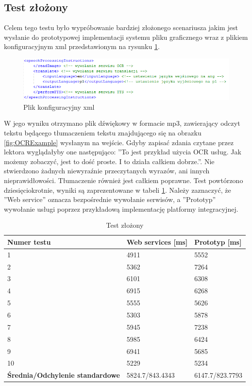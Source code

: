 \subsection{Test złożony}
Celem tego testu było wypróbowanie bardziej złożonego scenariusza jakim jest wysłanie do prototypowej implementacji systemu pliku graficznego wraz z plikiem konfiguracyjnym xml przedstawionym na rysunku \ref{fig:xmlConf}.
\begin{figure}[!h]
\centering
\includegraphics[scale=0.9]{xmlConf.png}
\caption{Plik konfiguracyjny xml}\label{fig:xmlConf}
\end{figure}
W jego wyniku otrzymano plik dźwiękowy w formacie mp3, zawierający odczyt tekstu będącego tłumaczeniem tekstu znajdującego się na obrazku \ref{fig:OCRExample} wysłanym na wejście. Gdyby zapisać zdania czytane przez lektora wyglądałyby one następująco: ''To jest przykład użycia OCR usług. Jak możemy zobaczyć, jest to dość proste. I to działa całkiem dobrze.''. Nie stwierdzono żadnych niewyraźnie przeczytanych wyrazów, ani innych nieprawidłowości. Tłumaczenie również jest całkiem poprawne. Test powtórzono dziesięciokrotnie, wyniki są zaprezentowane w tabeli \ref{tab:bigTest}. Należy zaznaczyć, że ''Web service'' oznacza bezpośrednie wywołanie serwisów, a ''Prototyp'' wywołanie usługi poprzez przykładową implementację platformy integracyjnej.
\begin{center}
	\begin{table}[t]
	\label{tab:bigTest}
	\caption{Test złożony}
	\centering
	\begin{tabular}{| l | l | l |}	
		\hline
		\textbf{Numer testu} & \textbf{Web services [ms]} & \textbf{Prototyp [ms]} \\ \hline
		1 & 4911 & 5552\\ \hline
		2 & 5362 & 7264\\ \hline
		3 & 6101 & 6308\\ \hline
		4 & 6915 & 6268\\ \hline
		5 & 5555 & 5626\\ \hline
		6 & 5303 & 5878\\ \hline
		7 & 5945 & 7238\\ \hline
		8 & 5985 & 6424\\ \hline
		9 & 6941 & 5685\\ \hline
		10 & 5229 & 5234\\ \hline
		\textbf{Średnia/Odchylenie standardowe} & 5824.7/843.4343 & 6147.7/823.7793\\ 
		\hline
	\end{tabular}
	\end{table}
\end{center}
